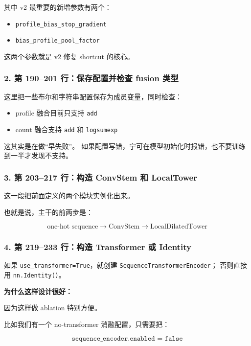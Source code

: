 \documentclass[11pt,a4paper]{ctexart}
\begin{document}
其中 v2 最重要的新增参数有两个：

\begin{itemize}[leftmargin=2em]
\item \texttt{profile\_bias\_stop\_gradient}
\item \texttt{bias\_profile\_pool\_factor}
\end{itemize}

这两个参数就是 v2 修复 shortcut 的核心。

\subsubsection*{2. 第 190--201 行：保存配置并检查 fusion 类型}

这里把一些布尔和字符串配置保存为成员变量，同时检查：

\begin{itemize}[leftmargin=2em]
\item profile 融合目前只支持 \texttt{add}
\item count 融合支持 \texttt{add} 和 \texttt{logsumexp}
\end{itemize}

这其实是在做“早失败”。
如果配置写错，宁可在模型初始化时报错，也不要训练到一半才发现不支持。

\subsubsection*{3. 第 203--217 行：构造 ConvStem 和 LocalTower}

这一段把前面定义的两个模块实例化出来。

也就是说，主干的前两步是：

\[
\text{one-hot sequence}
\rightarrow
\text{ConvStem}
\rightarrow
\text{LocalDilatedTower}
\]

\subsubsection*{4. 第 219--233 行：构造 Transformer 或 Identity}

如果 \texttt{use\_transformer=True}，就创建
\texttt{SequenceTransformerEncoder}；
否则直接用 \texttt{nn.Identity()}。

\textbf{为什么这样设计很好：}

因为这样做 ablation 特别方便。

比如我们有一个 no-transformer 消融配置，只需要把：

\[
\texttt{sequence\_encoder.enabled = false}
\]
\end{document}
